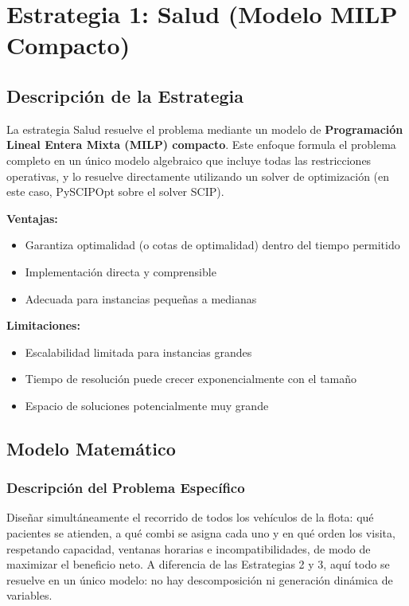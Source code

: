 \documentclass[12pt]{article}
\numberwithin{algorithm}{section}
\begin{document}
\newpage
\section{Estrategia 1: Salud (Modelo MILP Compacto)}

\subsection{Descripción de la Estrategia}

La estrategia Salud resuelve el problema mediante un modelo de \textbf{Programación Lineal Entera Mixta (MILP) compacto}. Este enfoque formula el problema completo en un único modelo algebraico que incluye todas las restricciones operativas, y lo resuelve directamente utilizando un solver de optimización (en este caso, PySCIPOpt sobre el solver SCIP).

\textbf{Ventajas:}
\begin{itemize}
    \item Garantiza optimalidad (o cotas de optimalidad) dentro del tiempo permitido
    \item Implementación directa y comprensible
    \item Adecuada para instancias pequeñas a medianas
\end{itemize}

\textbf{Limitaciones:}
\begin{itemize}
    \item Escalabilidad limitada para instancias grandes
    \item Tiempo de resolución puede crecer exponencialmente con el tamaño
    \item Espacio de soluciones potencialmente muy grande
\end{itemize}

\subsection{Modelo Matemático}

\subsubsection{Descripción del Problema Específico}

Diseñar simultáneamente el recorrido de todos los
vehículos de la flota: qué pacientes se atienden, a qué combi se asigna cada uno y en qué
orden los visita, respetando capacidad, ventanas horarias e incompatibilidades, de modo de
maximizar el beneficio neto. A diferencia de las Estrategias 2 y 3, aquí todo se resuelve en
un único modelo: no hay descomposición ni generación dinámica de variables.
\end{document}
